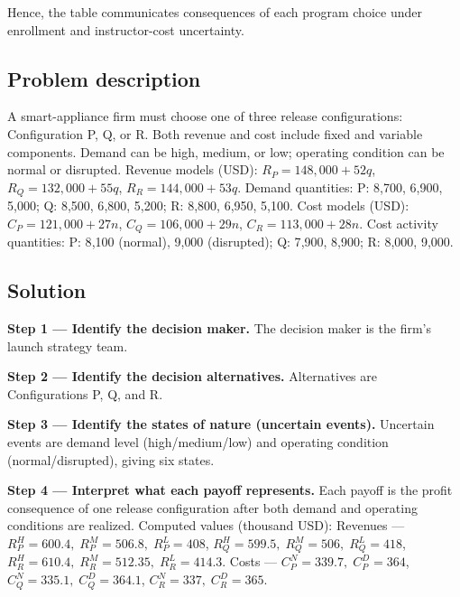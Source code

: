 \begin{ExamProblems}
		Hence, the table communicates consequences of each program choice under enrollment and instructor-cost uncertainty.
		
		\item
		\subsection*{Problem description}
		A smart-appliance firm must choose one of three release configurations:
		Configuration P, Q, or R.
		Both revenue and cost include fixed and variable components.
		Demand can be high, medium, or low; operating condition can be normal or disrupted.
		Revenue models (USD):
		\(R_P=148{,}000+52q\), \(R_Q=132{,}000+55q\), \(R_R=144{,}000+53q\).
		Demand quantities:
		P: 8{,}700, 6{,}900, 5{,}000;
		Q: 8{,}500, 6{,}800, 5{,}200;
		R: 8{,}800, 6{,}950, 5{,}100.
		Cost models (USD):
		\(C_P=121{,}000+27n\), \(C_Q=106{,}000+29n\), \(C_R=113{,}000+28n\).
		Cost activity quantities:
		P: 8{,}100 (normal), 9{,}000 (disrupted);
		Q: 7{,}900, 8{,}900;
		R: 8{,}000, 9{,}000.
		
		\subsection*{Solution}
		\textbf{Step 1 --- Identify the decision maker.} The decision maker is the firm's launch strategy team.
		
		\textbf{Step 2 --- Identify the decision alternatives.} Alternatives are Configurations P, Q, and R.
		
		\textbf{Step 3 --- Identify the states of nature (uncertain events).} Uncertain events are demand level (high/medium/low) and operating condition (normal/disrupted), giving six states.
		
		\textbf{Step 4 --- Interpret what each payoff represents.} Each payoff is the profit consequence of one release configuration after both demand and operating conditions are realized. Computed values (thousand USD):
		Revenues ---
		\(R_P^H=600.4,\;R_P^M=506.8,\;R_P^L=408\),
		\(R_Q^H=599.5,\;R_Q^M=506,\;R_Q^L=418\),
		\(R_R^H=610.4,\;R_R^M=512.35,\;R_R^L=414.3\).
		Costs ---
		\(C_P^N=339.7,\;C_P^D=364\),
		\(C_Q^N=335.1,\;C_Q^D=364.1\),
		\(C_R^N=337,\;C_R^D=365\).
		

\end{ExamProblems}
